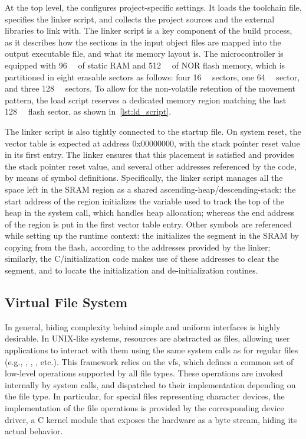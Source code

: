At the top level, the  configures project-specific settings. It loads the toolchain file, specifies the linker script, and collects the project sources and the external libraries to link with.
The linker script is a key component of the build process, as it describes how the sections in the input object files are mapped into the output executable file, and what its memory layout is.
The \mcu microcontroller is equipped with \qty{96}{\kibi\byte} of static RAM and \qty{512}{\kibi\byte} of NOR flash memory, which is partitioned in eight erasable sectors as follows: four \qty{16}{\kibi\byte} sectors, one \qty{64}{\kibi\byte} sector, and three \qty{128}{\kibi\byte} sectors. To allow for the non-volatile retention of the movement pattern, the load script reserves a dedicated memory region matching the last \qty{128}{\kibi\byte} flash sector, as shown in~\cref{lst:ld_script}.

The linker script is also tightly connected to the startup file. On system reset, the vector table is expected at address 0x00000000, with the stack pointer reset value in its first entry. The linker ensures that this placement is satisfied and provides the stack pointer reset value, and several other addresses referenced by the code, by means of symbol definitions. Specifically, the linker script manages all the space left in the SRAM region as a shared ascending-heap/descending-stack: the start address of the region initializes the variable used to track the top of the heap in the  system call, which handles heap allocation; whereas the end address of the region is put in the first vector table entry.
Other symbols are referenced while setting up the runtime context: the  initializes the  segment in the SRAM by copying from the flash, according to the addresses provided by the linker; similarly, the C/\cpp initialization code makes use of these addresses to clear the  segment, and to locate the initialization and de-initialization routines.

\subsection{Virtual File System}\label{subsec:files}

In general, hiding complexity behind simple and uniform interfaces is highly desirable. In UNIX-like systems, resources are abstracted as files, allowing user applications to interact with them using the same system calls as for regular files (e.g., , , , etc.). This framework relies on the \ac{vfs}, which defines a common set of low-level operations supported by all file types. These operations are invoked internally by system calls, and dispatched to their implementation depending on the file type. In particular, for special files representing character devices, the implementation of the file operations is provided by the corresponding device driver, a C kernel module that exposes the hardware as a byte stream, hiding its actual behavior.

